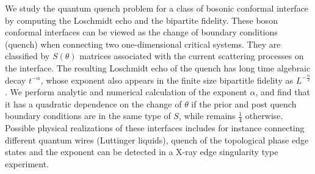 
We study the quantum quench problem for a class of bosonic conformal interface by computing the Loschmidt echo and the bipartite fidelity. These boson conformal interfaces can be viewed as the change of boundary conditions (quench) when connecting two one-dimensional critical systems. They are classified by $S(\theta)$ matrices associated with the current scattering processes on the interface. The resulting Loschmidt echo of the quench has long time algebraic decay $t^{-\alpha}$, whose exponent also appears in the finite size bipartitle fidelity as $L^{-\frac{\alpha}{2}}$. We perform analytic and numerical calculation of the exponent $\alpha$, and find that it has a quadratic dependence on the change of $\theta$ if the prior and post quench boundary conditions are in the same type of $S$, while remains $\frac{1}{4}$ otherwise. Possible physical realizations of these interfaces includes for instance connecting different quantum wires (Luttinger liquids), quench of the topological phase edge states \etc and the exponent can be detected in a X-ray edge singularity type experiment. 


